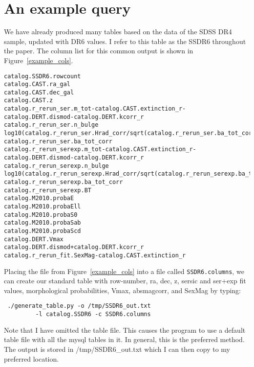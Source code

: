 \documentclass[useAMS,usenatbib,usegraphicx]{./mn2e}
\begin{document}
\section{An example query}
We have already produced many tables based on the data of the SDSS DR4 sample, updated with DR6 values. I refer to this table as the SSDR6 throughout the paper. The column list for this common output is shown in Figure~\ref{example_cols}.
\begin{figure*}\label{example_cols}
\begin{verbatim}
catalog.SSDR6.rowcount
catalog.CAST.ra_gal
catalog.CAST.dec_gal 
catalog.CAST.z
catalog.r_rerun_ser.m_tot-catalog.CAST.extinction_r-catalog.DERT.dismod-catalog.DERT.kcorr_r
catalog.r_rerun_ser.n_bulge
log10(catalog.r_rerun_ser.Hrad_corr/sqrt(catalog.r_rerun_ser.ba_tot_corr)*catalog.DERT.kpc_per_arcsec) 
catalog.r_rerun_ser.ba_tot_corr 
catalog.r_rerun_serexp.m_tot-catalog.CAST.extinction_r-catalog.DERT.dismod-catalog.DERT.kcorr_r
catalog.r_rerun_serexp.n_bulge
log10(catalog.r_rerun_serexp.Hrad_corr/sqrt(catalog.r_rerun_serexp.ba_tot_corr)*catalog.DERT.kpc_per_arcsec) 
catalog.r_rerun_serexp.ba_tot_corr 
catalog.r_rerun_serexp.BT
catalog.M2010.probaE
catalog.M2010.probaEll
catalog.M2010.probaS0
catalog.M2010.probaSab
catalog.M2010.probaScd
catalog.DERT.Vmax
catalog.DERT.dismod+catalog.DERT.kcorr_r
catalog.r_rerun_fit.SexMag-catalog.CAST.extinction_r
\end{verbatim}
\caption{The example column list used to produce a catalog similar to those commonly used in the past.}
\end{figure*}

Placing the file from Figure~\ref{example_cols} into a file called \texttt{SSDR6.columns}, we can create our standard table with row-number, ra, dec, z, sersic and ser+exp fit values, morphological probabilities, Vmax, absmagcorr, and SexMag by typing:
\begin{verbatim}
 ./generate_table.py -o /tmp/SSDR6_out.txt 
         -l catalog.SSDR6 -c SSDR6.columns
\end{verbatim} 
Note that I have omitted the table file. This causes the program to use a default table file with all the mysql tables in it. In general, this is the preferred method. The output is stored in /tmp/SSDR6\_out.txt which I can then copy to my preferred location.


\end{document}
